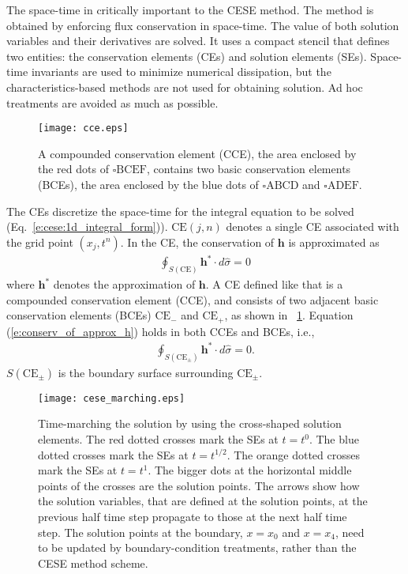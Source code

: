 \documentclass{turgon}
\begin{document}
The space-time in critically important to the CESE method.  The method is
obtained by enforcing flux conservation in space-time.  The value of both
solution variables and their derivatives are solved.  It uses a compact stencil
that defines two entities: the conservation elements (CEs) and solution
elements (SEs).  Space-time invariants are used to minimize numerical
dissipation, but the characteristics-based methods are not used for obtaining
solution.  Ad hoc treatments are avoided as much as possible.

\begin{figure}[htbp]
\centering
  \texttt{[image: cce.eps]}
  \caption{A compounded conservation element (CCE), the area enclosed by the
  {\color{red} red} dots of {\color{red} $\square\mathrm{BCEF}$}, contains two
  basic conservation elements (BCEs), the area enclosed by the {\color{blue}
  blue} dots of {\color{blue} $\square\mathrm{ABCD}$} and {\color{blue}
  $\square\mathrm{ADEF}$}.}
  \label{f:cce}
\end{figure}

The CEs discretize the space-time for the integral equation to be solved
(Eq.~\ref{e:cese:1d_integral_form})).  $\mathrm{CE}(j,n)$ denotes a single CE
associated with the grid point $(x_j, t^n)$.  In the CE, the conservation of
$\mathbf{h}$ is approximated as
\begin{align}
  \oint_{S(\mathrm{CE})}\mathbf{h}^*\cdot d\hat{\sigma} = 0
  \label{e:conserv_of_approx_h}
\end{align}
where $\mathbf{h}^*$ denotes the approximation of $\mathbf{h}$.  A CE defined
like that is a compounded conservation element (CCE), and consists of two
adjacent basic conservation elements (BCEs) $\mathrm{CE}_-$ and
$\mathrm{CE}_+$, as shown in \figurename~\ref{f:cce}.  Equation
(\ref{e:conserv_of_approx_h}) holds in both CCEs and BCEs, i.e.,
\begin{align*}
  \oint_{S(\mathrm{CE}_\pm)}\mathbf{h}^*\cdot d\hat{\sigma} = 0 .
\end{align*}
$S(\mathrm{CE}_{\pm})$ is the boundary surface surrounding $\mathrm{CE}_{\pm}$.

\begin{figure}[hbtp]
  \centering
  \texttt{[image: cese\_marching.eps]}
  \caption{Time-marching the solution by using the cross-shaped solution
  elements.  The {\color{red} red} dotted crosses mark the SEs at $t=t^0$.  The
  {\color{blue} blue} dotted crosses mark the SEs at $t=t^{1/2}$.  The
  {\color{orange} orange} dotted crosses mark the SEs at $t=t^1$.  The bigger
  dots at the horizontal middle points of the crosses are the solution points.
  The arrows show how the solution variables, that are defined at the solution
  points, at the previous half time step propagate to those at the next half
  time step.  The solution points at the boundary, $x=x_0$ and $x=x_4$, need to
  be updated by boundary-condition treatments, rather than the CESE method
  scheme.}
  \label{f:cese_marching}
\end{figure}
\end{document}
